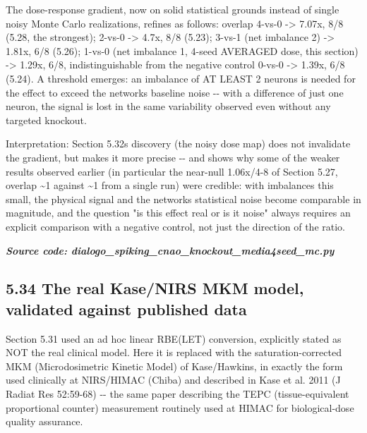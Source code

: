 \documentclass[
  english,
]{article}
\begin{document}
The dose-response gradient, now on solid statistical grounds instead of single noisy Monte Carlo realizations, refines as follows: overlap 4-vs-0 -\textgreater{} 7.07x, 8/8 (5.28, the strongest); 2-vs-0 -\textgreater{} 4.7x, 8/8 (5.23); 3-vs-1 (net imbalance 2) -\textgreater{} 1.81x, 6/8 (5.26); 1-vs-0 (net imbalance 1, 4-seed AVERAGED dose, this section) -\textgreater{} 1.29x, 6/8, indistinguishable from the negative control 0-vs-0 -\textgreater{} 1.39x, 6/8 (5.24). A threshold emerges: an imbalance of AT LEAST 2 neurons is needed for the effect to exceed the network\textquotesingle s baseline noise -\/- with a difference of just one neuron, the signal is lost in the same variability observed even without any targeted knockout.

Interpretation: Section 5.32\textquotesingle s discovery (the noisy dose map) does not invalidate the gradient, but makes it more precise -\/- and shows why some of the weaker results observed earlier (in particular the near-null 1.06x/4-8 of Section 5.27, overlap \textasciitilde1 against \textasciitilde1 from a single run) were credible: with imbalances this small, the physical signal and the network\textquotesingle s statistical noise become comparable in magnitude, and the question "is this effect real or is it noise" always requires an explicit comparison with a negative control, not just the direction of the ratio.

\textit{\textbf{Source code: dialogo\_\allowbreak{}spiking\_\allowbreak{}cnao\_\allowbreak{}knockout\_\allowbreak{}media4seed\_\allowbreak{}mc.py}}


\subsection{5.34 The real Kase/NIRS MKM model, validated against published data}\label{the-real-kasenirs-mkm-model-validated-against-published-data}

Section 5.31 used an ad hoc linear RBE(LET) conversion, explicitly stated as NOT the real clinical model. Here it is replaced with the saturation-corrected MKM (Microdosimetric Kinetic Model) of Kase/Hawkins, in exactly the form used clinically at NIRS/HIMAC (Chiba) and described in Kase et al. 2011 (J Radiat Res 52:59-68) -\/- the same paper describing the TEPC (tissue-equivalent proportional counter) measurement routinely used at HIMAC for biological-dose quality assurance.
\end{document}
